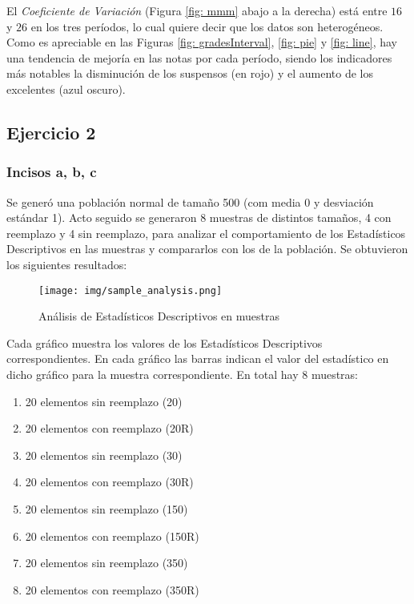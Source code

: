 \documentclass[a4paper,10pt,twocolumn]{article}
\begin{document}
	El \emph{Coeficiente de Variación} (Figura \ref{fig: mmm} abajo a la derecha) está entre $16$ y $26$ en los tres períodos, lo cual quiere decir que los datos son heterogéneos.\\
	
	Como es apreciable en las Figuras \ref{fig: gradesInterval}, \ref{fig: pie} y \ref{fig: line}, hay una tendencia de mejoría en las notas por cada período, siendo los indicadores más notables la disminución de los suspensos (en rojo) y el aumento de los excelentes (azul oscuro). \\
	\subsection{Ejercicio 2}\label{sub:results2}
		\subsubsection{Incisos a, b, c}
		Se generó una población normal de tamaño 500 (com media 0 y desviación estándar 1). Acto seguido se generaron 8 muestras de distintos tamaños, 4 con reemplazo y 4 sin reemplazo, para analizar el comportamiento de los Estadísticos Descriptivos en las muestras y compararlos con los de la población. Se obtuvieron los siguientes resultados:
		
		\begin{figure}[htb]
			\begin{center}
				\texttt{[image: img/sample\_analysis.png]}
			\end{center}
			\caption{Análisis de Estadísticos Descriptivos en muestras}%
		\end{figure}
		
		Cada gráfico muestra los valores de los Estadísticos Descriptivos correspondientes. En cada gráfico las barras indican el valor del estadístico en dicho gráfico para la muestra correspondiente. En total hay 8 muestras:
		
		\begin{enumerate}
			\item 20 elementos sin reemplazo (20)
			\item 20 elementos con reemplazo (20R)
			
			\item 20 elementos sin reemplazo (30)
			\item 20 elementos con reemplazo (30R)
			
			\item 20 elementos sin reemplazo (150)
			\item 20 elementos con reemplazo (150R)
			
			\item 20 elementos sin reemplazo (350)
			\item 20 elementos con reemplazo (350R)
		\end{enumerate}
		
\end{document}
